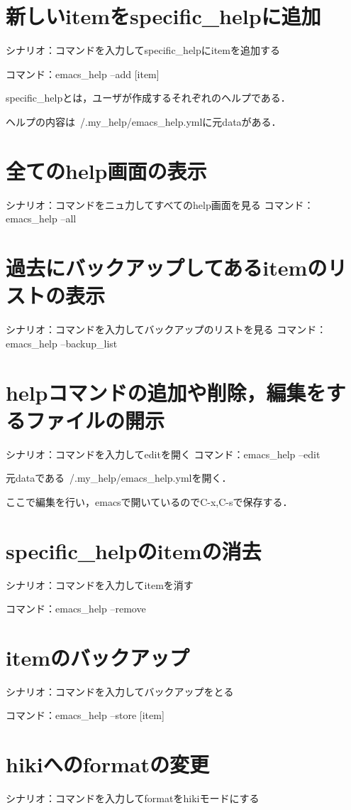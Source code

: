 
\section{新しいitemをspecific\_helpに追加}
シナリオ：コマンドを入力してspecific\_helpにitemを追加する

コマンド：emacs\_help --add [item]

specific\_helpとは，ユーザが作成するそれぞれのヘルプである．

ヘルプの内容は~/.my\_help/emacs\_help.ymlに元dataがある．

\section{全てのhelp画面の表示}
シナリオ：コマンドをニュ力してすべてのhelp画面を見る
コマンド：emacs\_help --all

\section{過去にバックアップしてあるitemのリストの表示}
シナリオ：コマンドを入力してバックアップのリストを見る
コマンド：emacs\_help --backup\_list

\section{helpコマンドの追加や削除，編集をするファイルの開示}
シナリオ：コマンドを入力してeditを開く
コマンド：emacs\_help --edit

元dataである~/.my\_help/emacs\_help.ymlを開く．

ここで編集を行い，emacsで開いているのでC-x,C-sで保存する．

\section{specific\_helpのitemの消去}
シナリオ：コマンドを入力してitemを消す

コマンド：emacs\_help --remove

\section{itemのバックアップ}
シナリオ：コマンドを入力してバックアップをとる

コマンド：emacs\_help --store [item]

\section{hikiへのformatの変更}
シナリオ：コマンドを入力してformatをhikiモードにする

